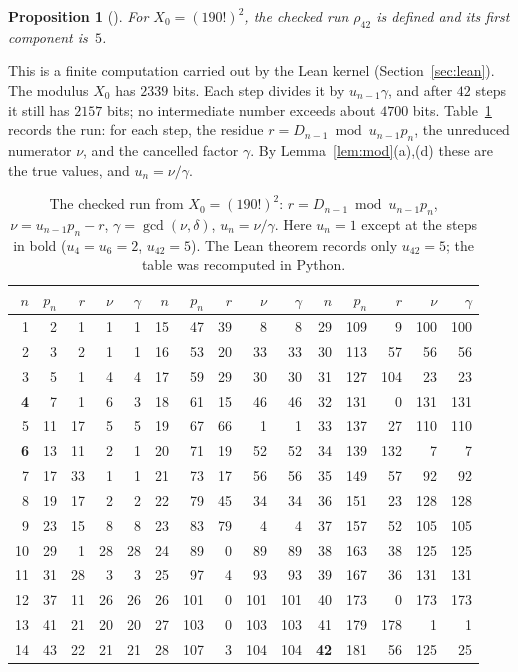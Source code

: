 \documentclass[11pt]{amsart}
\theoremstyle{plain}
\newtheorem{proposition}[theorem]{Proposition}
\theoremstyle{definition}
\begin{document}
\begin{proposition}[]\label{prop:run}
For $X_0=(190!)^2$, the checked run $\rho_{42}$ is defined and its first component is~$5$.
\end{proposition}

This is a finite computation carried out by the Lean kernel (Section~\ref{sec:lean}). The modulus $X_0$ has $2339$ bits. Each step divides it by $u_{n-1}\gamma$, and after $42$ steps it still has $2157$ bits; no intermediate number exceeds about $4700$ bits.
Table~\ref{tab:run} records the run: for each step, the residue $r=D_{n-1}\bmod u_{n-1}p_n$, the unreduced numerator $\nu$, and the cancelled factor $\gamma$. By Lemma~\ref{lem:mod}(a),(d) these are the true values, and $u_n=\nu/\gamma$.

\begin{table}[tbp]
\centering\footnotesize
\setlength{\tabcolsep}{3.6pt}
\begin{tabular}{rrrrr@{\hspace{1.6em}}rrrrr@{\hspace{1.6em}}rrrrr}
\toprule
$n$ & $p_n$ & $r$ & $\nu$ & $\gamma$ & $n$ & $p_n$ & $r$ & $\nu$ & $\gamma$ & $n$ & $p_n$ & $r$ & $\nu$ & $\gamma$\\
\midrule
1 & 2 & 1 & 1 & 1 & 15 & 47 & 39 & 8 & 8 & 29 & 109 & 9 & 100 & 100\\
2 & 3 & 2 & 1 & 1 & 16 & 53 & 20 & 33 & 33 & 30 & 113 & 57 & 56 & 56\\
3 & 5 & 1 & 4 & 4 & 17 & 59 & 29 & 30 & 30 & 31 & 127 & 104 & 23 & 23\\
\textbf{4} & 7 & 1 & 6 & 3 & 18 & 61 & 15 & 46 & 46 & 32 & 131 & 0 & 131 & 131\\
5 & 11 & 17 & 5 & 5 & 19 & 67 & 66 & 1 & 1 & 33 & 137 & 27 & 110 & 110\\
\textbf{6} & 13 & 11 & 2 & 1 & 20 & 71 & 19 & 52 & 52 & 34 & 139 & 132 & 7 & 7\\
7 & 17 & 33 & 1 & 1 & 21 & 73 & 17 & 56 & 56 & 35 & 149 & 57 & 92 & 92\\
8 & 19 & 17 & 2 & 2 & 22 & 79 & 45 & 34 & 34 & 36 & 151 & 23 & 128 & 128\\
9 & 23 & 15 & 8 & 8 & 23 & 83 & 79 & 4 & 4 & 37 & 157 & 52 & 105 & 105\\
10 & 29 & 1 & 28 & 28 & 24 & 89 & 0 & 89 & 89 & 38 & 163 & 38 & 125 & 125\\
11 & 31 & 28 & 3 & 3 & 25 & 97 & 4 & 93 & 93 & 39 & 167 & 36 & 131 & 131\\
12 & 37 & 11 & 26 & 26 & 26 & 101 & 0 & 101 & 101 & 40 & 173 & 0 & 173 & 173\\
13 & 41 & 21 & 20 & 20 & 27 & 103 & 0 & 103 & 103 & 41 & 179 & 178 & 1 & 1\\
14 & 43 & 22 & 21 & 21 & 28 & 107 & 3 & 104 & 104 & \textbf{42} & 181 & 56 & 125 & 25\\
\bottomrule
\end{tabular}
\caption{The checked run from $X_0=(190!)^2$: $r=D_{n-1}\bmod u_{n-1}p_n$, $\nu=u_{n-1}p_n-r$, $\gamma=\gcd(\nu,\delta)$, $u_n=\nu/\gamma$. Here $u_n=1$ except at the steps in bold ($u_4=u_6=2$, $u_{42}=5$). The Lean theorem records only $u_{42}=5$; the table was recomputed in Python.}
\label{tab:run}
\end{table}
\end{document}

